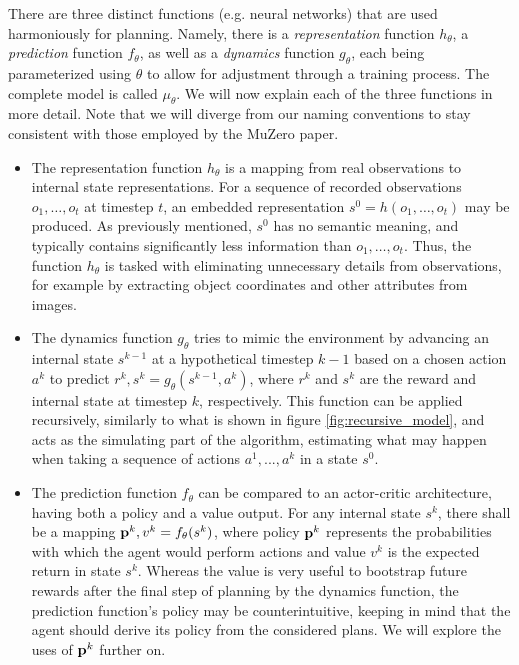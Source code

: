 There are three distinct functions (e.g. neural networks) that are used harmoniously for planning. Namely, there is a \textit{representation} function $h_\theta$, a \textit{prediction} function $f_\theta$, as well as a \textit{dynamics} function $g_\theta$, each being parameterized using $\theta$ to allow for adjustment through a training process. The complete model is called $\mu_\theta$. We will now explain each of the three functions in more detail. Note that we will diverge from our naming conventions to stay consistent with those employed by the MuZero paper.
\begin{itemize}
    \item The representation function $h_\theta$ is a mapping from real observations to internal state representations. For a sequence of recorded observations $o_1, \dots, o_t$ at timestep $t$, an embedded representation $s^0 = h(o_1, \dots, o_t)$ may be produced. As previously mentioned, $s^0$ has no semantic meaning, and typically contains significantly less information than $o_1, \dots, o_t$. Thus, the function $h_\theta$ is tasked with eliminating unnecessary details from observations, for example by extracting object coordinates and other attributes from images.

    \item The dynamics function $g_\theta$ tries to mimic the environment by advancing an internal state $s^{k-1}$ at a hypothetical timestep $k-1$ based on a chosen action $a^k$ to predict $r^k, s^k = g_\theta\left(s^{k-1}, a^k\right)$, where $r^k$ and $s^k$ are the reward and internal state at timestep $k$, respectively. This function can be applied recursively, similarly to what is shown in figure \ref{fig:recursive_model}, and acts as the simulating part of the algorithm, estimating what may happen when taking a sequence of actions $a^1, ..., a^k$ in a state $s^0$.

    \item The prediction function $f_\theta$ can be compared to an actor-critic architecture, having both a policy and a value output. For any internal state $s^k$, there shall be a mapping $\text{\textbf{p}}^k, v^k = f_\theta(s^k)$, where policy $\text{\textbf{p}}^k$ represents the probabilities with which the agent would perform actions and value $v^k$ is the expected return in state $s^k$. Whereas the value is very useful to bootstrap future rewards after the final step of planning by the dynamics function, the prediction function's policy may be counterintuitive, keeping in mind that the agent should derive its policy from the considered plans. We will explore the uses of $\text{\textbf{p}}^k$ further on.
\end{itemize}

